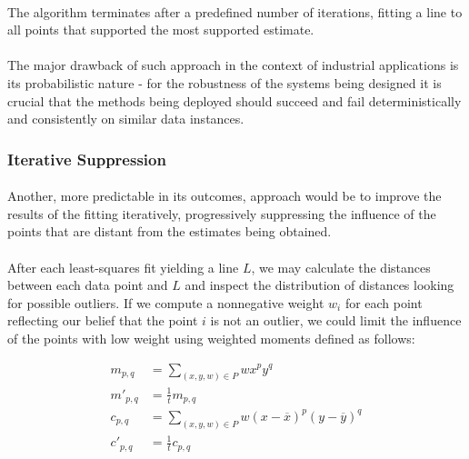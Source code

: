 \paragraph*{}
The algorithm terminates after a predefined number of iterations, fitting a line to all points that supported the most supported estimate.

\paragraph*{}
The major drawback of such approach in the context of industrial applications is its probabilistic nature - for the robustness of the systems being designed it is crucial that the methods being deployed should succeed and fail deterministically and consistently on similar data instances.

\subsubsection{Iterative Suppression}

\paragraph*{}
Another, more predictable in its outcomes, approach would be to improve the results of the fitting iteratively, progressively suppressing the influence of the points that are distant from the estimates being obtained. 

\paragraph*{}
After each least-squares fit yielding a line $L$, we may calculate the distances between each data point and $L$ and inspect the distribution of distances looking for possible outliers. If we compute a nonnegative weight $w_i$ for each point reflecting our belief that the point $i$ is not an outlier, we could limit the influence of the points with low weight using weighted moments defined as follows:

\begin{align*}
	m_{p,q} &= \sum_{(x,y,w) \in P} w {x}^p {y}^q \\
	m'_{p,q} &= \frac{1}{t} m_{p,q} \\
	c_{p,q} &= \sum_{(x,y,w) \in P} w ({x}-\overline{x})^p ({y}-\overline{y})^q \\
	c'_{p,q} &= \frac{1}{t} c_{p,q}
\end{align*}

